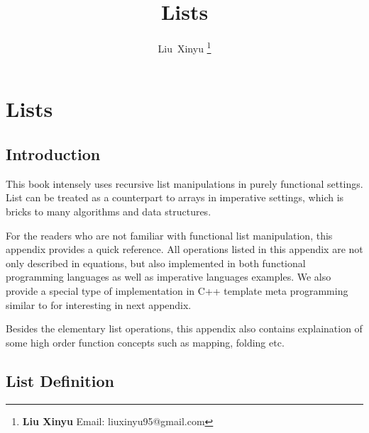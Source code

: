 \documentclass{article}
\begin{document}
\fi


\title{Lists}

\author{Liu~Xinyu
\thanks{{\bfseries Liu Xinyu } \newline
  Email: liuxinyu95@gmail.com \newline}
  }


\maketitle

\ifx\wholebook\relax
\chapter{Lists}
\fi

\section{Introduction}
\label{introduction}
This book intensely uses recursive list manipulations in purely functional settings.
List can be treated as a counterpart to arrays in imperative settings, which is
bricks to many algorithms and data structures.

For the readers who are not familiar with functional list manipulation, this appendix
provides a quick reference. All operations listed in this appendix are not only
described in equations, but also implemented in both functional programming languages
as well as imperative languages examples. We also provide a special type of
implementation in C++ template meta programming similar to \cite{moderncxx}
for interesting in next appendix.

Besides the elementary list operations, this appendix also contains explaination of 
some high order function concepts such as mapping, folding etc.


\section{List Definition}
\end{document}
